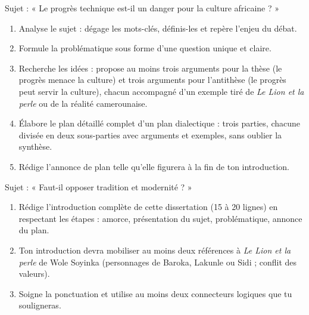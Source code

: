 \documentclass[11pt]{article}
\newcounter{popsec}
\newcounter{popsub}
\newcommand{\courssub}[1]{%
  \stepcounter{popsub}%
  \par\vspace{9pt}\noindent{\popxbold\fontsize{11.5}{13}\selectfont\color{popink}{\color{poporange}\thepopsec.\thepopsub}\hspace{6pt}#1}\par\nopagebreak\vspace{4pt}
}
\begin{document}
\courssub{Je me prépare au Bac}

\begin{exercice}
Sujet : « Le progrès technique est-il un danger pour la culture africaine ? »
\begin{enumerate}
\item Analyse le sujet : dégage les mots-clés, définis-les et repère l'enjeu du débat.
\item Formule la problématique sous forme d'une question unique et claire.
\item Recherche les idées : propose au moins trois arguments pour la thèse (le progrès menace la culture) et trois arguments pour l'antithèse (le progrès peut servir la culture), chacun accompagné d'un exemple tiré de \emph{Le Lion et la perle} ou de la réalité camerounaise.
\item Élabore le plan détaillé complet d'un plan dialectique : trois parties, chacune divisée en deux sous-parties avec arguments et exemples, sans oublier la synthèse.
\item Rédige l'annonce de plan telle qu'elle figurera à la fin de ton introduction.
\end{enumerate}
\end{exercice}

\begin{exercice}
Sujet : « Faut-il opposer tradition et modernité ? »
\begin{enumerate}
\item Rédige l'introduction complète de cette dissertation (15 à 20 lignes) en respectant les étapes : amorce, présentation du sujet, problématique, annonce du plan.
\item Ton introduction devra mobiliser au moins deux références à \emph{Le Lion et la perle} de Wole Soyinka (personnages de Baroka, Lakunle ou Sidi ; conflit des valeurs).
\item Soigne la ponctuation et utilise au moins deux connecteurs logiques que tu souligneras.
\end{enumerate}
\end{exercice}
\end{document}
